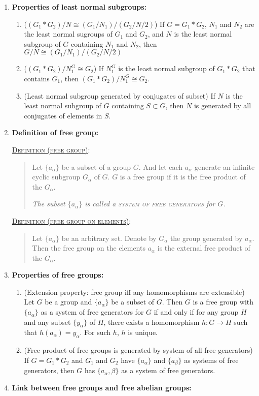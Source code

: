 \documentclass[letterpaper, 12pt]{book}
\newcommand{\defn}[2]{\textsc{\underline{Definition (#1)}:}\begin{quote} #2\end{quote}}
\begin{document}
\begin{enumerate}[resume]
        \defn{least normal subgroup}{If $S$ is a subset of $G$, the least normal subgroup of $G$ that contains $S$ is the intersection $N$ of all normal subgroups of $G$ that contain $S$.}
    \item \textbf{Properties of least normal subgroups:}
        \begin{enumerate}
        \item ($(G_1*G_2)/N\cong (G_1/N_1) / (G_2/N/2)$) If $G = G_1*G_2$, $N_1$ and $N_2$ are the least normal sugroups of $G_1$ and $G_2$, and $N$ is the least normal subgroup of $G$ containing $N_1$ and $N_2$, then $G/N \cong (G_1/N_1) / (G_2/N/2)$
        \item ($(G_1*G_2)/N_1^G\cong G_2$) If $N_1^G$ is the least normal subgroup of $G_1*G_2$ that contains $G_1$, then $(G_1*G_2)/N_1^G\cong G_2$.
        \item (Least normal subgroup generated by conjugates of subset) If $N$ is the least normal subgroup of $G$ containing $S\subset G$, then $N$ is generated by all conjugates of elements in $S$.
        \end{enumerate}
    \item \textbf{Definition of free group:}
        
        \defn{free group}{Let $\{a_\alpha\}$ be a subset of a group $G$. And let each $a_\alpha$ generate an infinite cyclic subgroup $G_\alpha$ of $G$. $G$ is a free group if it is the free product of the $G_\alpha$.

        \textit{The subset $\{a_\alpha\}$ is called a \textsc{system of free generators} for $G$.}}

        \defn{free group on elements}{Let $\{a_\alpha\}$ be an arbitrary set. Denote by $G_\alpha$ the group generated by $a_\alpha$. Then the free group on the elements $a_\alpha$ is the external free product of the $G_\alpha$.}
    \item \textbf{Properties of free groups:}
        \begin{enumerate}
        \item (Extension property: free group iff any homomorphisms are extensible) Let $G$ be a group and $\{a_\alpha\}$ be a subset of $G$. Then $G$ is a free group with $\{a_\alpha\}$ as a system of free generators for $G$ if and only if for any group $H$ and any subset $\{y_\alpha\}$ of $H$, there exists a homomorphism $h: G\to H$ such that $h(a_\alpha) = y_\alpha$. For such $h$, $h$ is unique.
        \item (Free product of free groups is generated by system of all free generators) If $G = G_1 * G_2$ and $G_1$ and $G_2$ have $\{a_\alpha\}$ and $\{a_\beta\}$ as systems of free generators, then $G$ has $\{a_\alpha,\beta\}$ as a system of free generators.
        \end{enumerate}
    \item \textbf{Link between free groups and free abelian groups:}


\end{enumerate}
\end{document}
